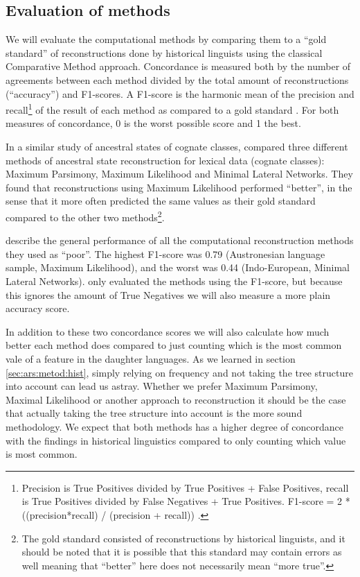 \documentclass[a4paper,10pt]{article} %
\begin{document}
\subsection{Evaluation of methods}
We will evaluate the computational methods by comparing them to a ``gold standard'' of reconstructions done by historical linguists using the classical Comparative Method approach. Concordance is measured both by the number of agreements between each method divided by the total amount of reconstructions (``accuracy'') and F1-scores. A F1-score is the harmonic mean of the precision and recall\footnote{Precision is True Positives divided by True Positives + False Positives, recall is True Positives divided by False Negatives + True Positives. F1-score = 2 * ((precision*recall) / (precision + recall)) \citep{van1979information}.} of the result of each method as compared to a gold standard \citep[133]{van1979information}. For both measures of concordance, 0 is the worst possible score and 1 the best. 

In a similar study of ancestral states of cognate classes, \citet{jager2018using} compared three different methods of ancestral state reconstruction for lexical data (cognate classes): Maximum Parsimony, Maximum Likelihood and Minimal Lateral Networks. They found that reconstructions using Maximum Likelihood performed ``better'', in the sense that it more often predicted the same values as their gold standard compared to the other two methods\footnote{ The gold standard consisted of reconstructions by historical linguists, and it should be noted that it is possible that this standard may contain errors as well meaning that ``better'' here does not necessarily mean ``more true''.}. 

\citet{jager2018using} describe the general performance of all the computational reconstruction methods they used as ``poor''. The highest F1-score was 0.79 (Austronesian language sample, Maximum Likelihood), and the worst was 0.44 (Indo-European, Minimal Lateral Networks). \citet{jager2018using} only evaluated the methods using the F1-score, but because this ignores the amount of True Negatives we will also measure a more plain accuracy score. 

In addition to these two concordance scores we will also calculate how much better each method does compared to just counting which is the most common vale of a feature in the daughter languages. As we learned in section \ref{sec:ars:metod:hist}, simply relying on frequency and not taking the tree structure into account can lead us astray. Whether we prefer Maximum Parsimony, Maximal Likelihood or another approach to reconstruction it should be the case that actually taking the tree structure into account is the more sound methodology. We expect that both methods has a higher degree of concordance with the findings in historical linguistics compared to only counting which value is most common.
\end{document}
